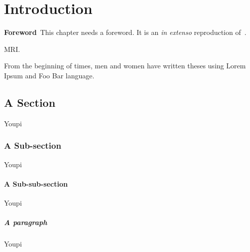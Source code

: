 \chapter{Introduction}
\label{chap:intro}
\minitoc

\begin{center}
  \begin{minipage}[b]{0.9\linewidth}
    \small
    \textbf{Foreword\,}
    This chapter needs a foreword. It is an \emph{in extenso} reproduction of~\cite{perez-garcia_self-supervised_2021}.
  \end{minipage}
\end{center}

\ac{MRI}.

From the beginning of times, men and women have written theses using Lorem Ipsum and Foo Bar language.

\section{A Section}
%
Youpi

\subsection{A Sub-section}
%
Youpi

\subsubsection{A Sub-sub-section}
%
Youpi

\paragraph{A paragraph}
%
Youpi
